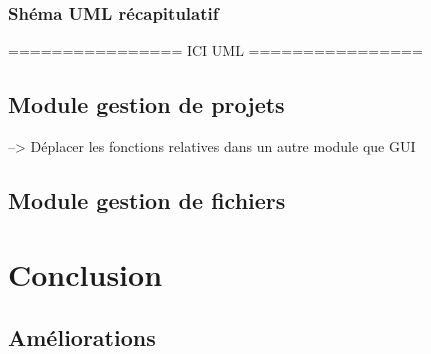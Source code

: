 \documentclass[a4paper,12pt]{article}
\begin{document}
			
			\subsubsection*{Shéma UML récapitulatif}
					
					================ ICI UML ================
		
		\subsection{Module gestion de projets}
			--> Déplacer les fonctions relatives dans un autre module que GUI
			
		\subsection{Module gestion de fichiers}	
	
\section{Conclusion}
	
	\subsection{Améliorations}
\end{document}
